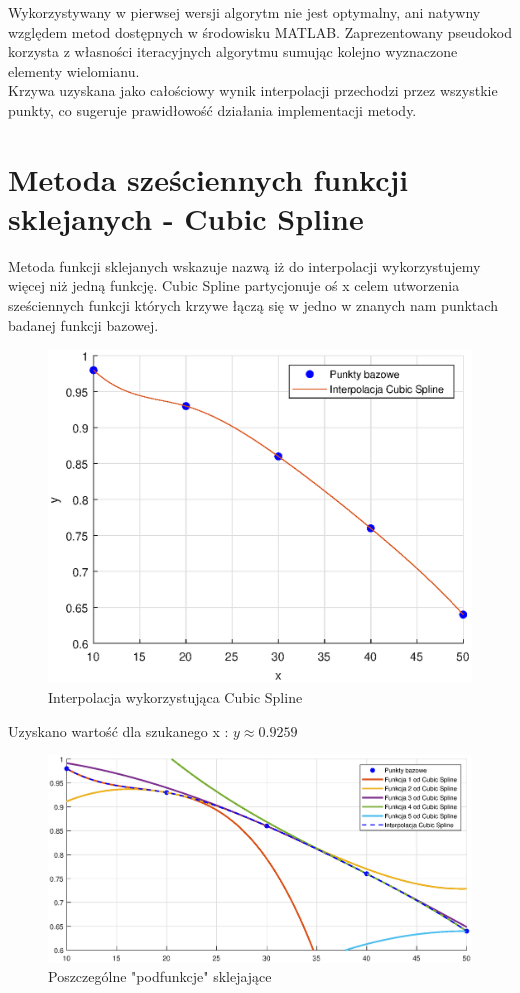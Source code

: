 \documentclass{article}
\begin{document}
        Wykorzystywany w pierwsej wersji algorytm nie jest optymalny, ani natywny względem metod dostępnych w środowisku MATLAB. Zaprezentowany pseudokod korzysta z własności iteracyjnych algorytmu sumując kolejno wyznaczone elementy wielomianu.\\ Krzywa uzyskana jako całościowy wynik interpolacji przechodzi przez wszystkie punkty, co sugeruje prawidłowość działania implementacji metody.
\section{Metoda sześciennych funkcji sklejanych - Cubic Spline}
Metoda funkcji sklejanych wskazuje nazwą iż do interpolacji wykorzystujemy więcej niż jedną funkcję. Cubic Spline partycjonuje oś x celem utworzenia sześciennych funkcji których krzywe łączą się w jedno w znanych nam punktach badanej funkcji bazowej.
 \begin{figure}[H]
            \centering
            \includegraphics[width=\linewidth]{newImg/CubicSpline.eps}
        \caption{Interpolacja wykorzystująca Cubic Spline}
            \label{fig:my_label}
        \end{figure}
Uzyskano wartość dla szukanego x : $y \approx 0.9259$
 \begin{figure}[H]
            \centering
            \includegraphics[width=\linewidth]{newImg/CSfunc.eps}
        \caption{Poszczególne "podfunkcje" sklejające}
            \label{fig:my_label}
        \end{figure}
\end{document}
